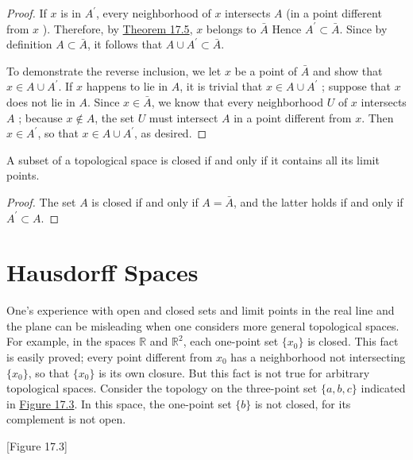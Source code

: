 \begin{proof}
 If \(x\) is in \(A^{\prime }\), every neighborhood of \(x\) intersects \(A\) (in a point different from \(x\) ). Therefore, by \hyperref[thm:17.5]{Theorem 17.5}, \(x\) belongs to \(\bar{A}\) Hence \(A^{\prime } \subset \bar{A}\). Since by definition \(A \subset \bar{A}\), it follows that \(A \cup {A}^{\prime } \subset \bar{A}\).

 To demonstrate the reverse inclusion, we let \(x\) be a point of \(\bar{A}\) and show that \(x \in A \cup {A}^{\prime }\). If \(x\) happens to lie in \(A\), it is trivial that \(x \in A \cup {A}^{\prime }\) ; suppose that \(x\) does not lie in \(A\). Since \(x \in \bar{A}\), we know that every neighborhood \(U\) of \(x\) intersects \(A\) ; because \(x \notin A\), the set \(U\) must intersect \(A\) in a point different from \(x\). Then \(x \in {A}^{\prime }\), so that \(x \in A \cup {A}^{\prime }\), as desired.
\end{proof}

\begin{corollary}
\label{cor:\thetheorem}
 A subset of a topological space is closed if and only if it contains all its limit points.
\end{corollary}

\begin{proof}
 The set \(A\) is closed if and only if \(A = \bar{A}\), and the latter holds if and only if \(A^{\prime } \subset A\).
\end{proof}

\section*{Hausdorff Spaces}

One's experience with open and closed sets and limit points in the real line and the plane can be misleading when one considers more general topological spaces. For example, in the spaces \(\mathbb{R}\) and \(\mathbb{R}^{2}\), each one-point set \(\{ x_{0}\}\) is closed. This fact is easily proved; every point different from \(x_{0}\) has a neighborhood not intersecting \(\{ x_{0}\}\), so that \(\{ x_{0}\}\) is its own closure. But this fact is not true for arbitrary topological spaces. Consider the topology on the three-point set \(\{ a,b,c\}\) indicated in \hyperref[fig:17.3]{Figure 17.3}. In this space, the one-point set \(\{ b\}\) is not closed, for its complement is not open.

[Figure 17.3]

